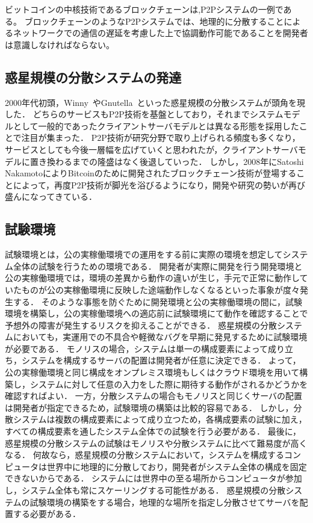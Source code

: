 ビットコインの中核技術であるブロックチェーンは,P2Pシステムの一例である。
ブロックチェーンのようなP2Pシステムでは、地理的に分散することによるネットワークでの通信の遅延を考慮した上で協調動作可能であることを開発者は意識しなければならない。

\subsection{惑星規模の分散システムの発達}

2000年代初頭，Winny~\cite{Winny}やGnutella~\cite{Gnutella}といった惑星規模の分散システムが頭角を現した．
どちらのサービスもP2P技術を基盤としており，それまでシステムモデルとして一般的であったクライアントサーバモデルとは異なる形態を採用したことで注目が集まった．
P2P技術が研究分野で取り上げられる頻度も多くなり，サービスとしても今後一層幅を広げていくと思われたが，クライアントサーバモデルに置き換わるまでの隆盛はなく後退していった．
しかし，2008年にSatoshi NakamotoによりBitcoinのために開発されたブロックチェーン技術が登場することによって，再度P2P技術が脚光を浴びるようになり，開発や研究の勢いが再び盛んになってきている．

\subsection{試験環境}

試験環境とは，公の実稼働環境での運用をする前に実際の環境を想定してシステム全体の試験を行うための環境である．
開発者が実際に開発を行う開発環境と公の実稼働環境では，環境の差異から動作の違いが生じ，手元で正常に動作していたものが公の実稼働環境に反映した途端動作しなくなるといった事象が度々発生する．
そのような事態を防ぐために開発環境と公の実稼働環境の間に，試験環境を構築し，公の実稼働環境への適応前に試験環境にて動作を確認することで予想外の障害が発生するリスクを抑えることができる．
惑星規模の分散システムにおいても，実運用での不具合や軽微なバグを早期に発見するために試験環境が必要である．
モノリスの場合，システムは単一の構成要素によって成り立ち，システムを構成するサーバの配置は開発者が任意に決定できる．
よって，公の実稼働環境と同じ構成をオンプレミス環境もしくはクラウド環境を用いて構築し，システムに対して任意の入力をした際に期待する動作がされるかどうかを確認すればよい．
一方，分散システムの場合もモノリスと同じくサーバの配置は開発者が指定できるため，試験環境の構築は比較的容易である．
しかし，分散システムは複数の構成要素によって成り立つため，各構成要素の試験に加え，すべての構成要素を通したシステム全体での試験を行う必要がある．
最後に，惑星規模の分散システムの試験はモノリスや分散システムに比べて難易度が高くなる．
何故なら，惑星規模の分散システムにおいて，システムを構成するコンピュータは世界中に地理的に分散しており，開発者がシステム全体の構成を固定できないからである．
システムには世界中の至る場所からコンピュータが参加し，システム全体も常にスケーリングする可能性がある．
惑星規模の分散システムの試験環境の構築をする場合，地理的な場所を指定し分散させてサーバを配置する必要がある．

